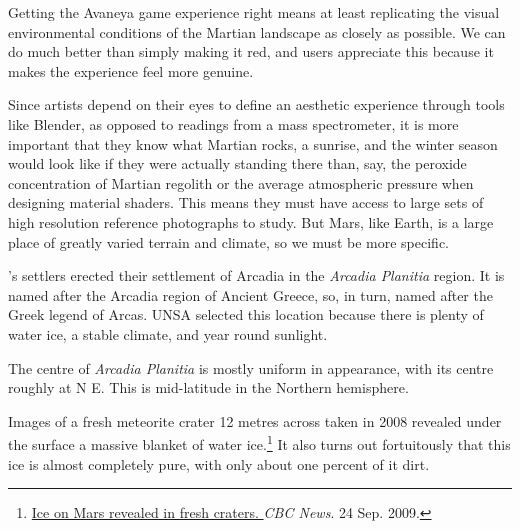 


    {}
Getting the Avaneya game experience right means at least replicating the visual environmental conditions of the Martian landscape as closely as possible. We can do much better than simply making it red, and users appreciate this because it makes the experience feel more genuine.

Since artists depend on their eyes to define an aesthetic experience through tools like Blender, as opposed to readings from a mass spectrometer, it is more important that they know what Martian rocks, a sunrise, and the winter season would look like if they were actually standing there than, say, the peroxide concentration of Martian regolith or the average atmospheric pressure when designing material shaders. This means they must have access to large sets of high resolution reference photographs to study. But Mars, like Earth, is a large place of greatly varied terrain and climate, so we must be more specific.

's settlers erected their settlement of Arcadia in the {\it Arcadia Planitia} region. It is named after the Arcadia region of Ancient Greece, so, in turn, named after the Greek legend of Arcas. UNSA selected this location because there is plenty of water ice, a stable climate, and year round sunlight.

The centre of {\it Arcadia Planitia} is mostly uniform in appearance, with its centre roughly at N E. This is mid-latitude in the Northern hemisphere. 

Images of a fresh meteorite crater 12 metres across taken in 2008 revealed under the surface a massive blanket of water ice.\footnote{\href{http://www.cbc.ca/news/technology/story/2009/09/24/tech-space-water-mars-crater.html}{Ice on Mars revealed in fresh craters. }{\it CBC News}. 24 Sep. 2009.} It also turns out fortuitously that this ice is almost completely pure, with only about one percent of it dirt.

